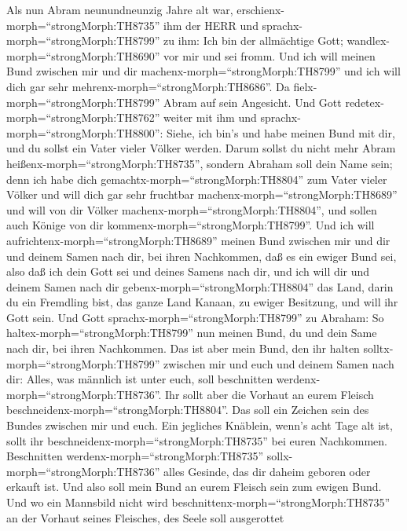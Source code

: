  Als nun Abram neunundneunzig Jahre alt war,
erschienx-morph=``strongMorph:TH8735'' ihm der HERR und
sprachx-morph=``strongMorph:TH8799'' zu ihm: Ich bin der allmächtige
Gott; wandlex-morph=``strongMorph:TH8690'' vor mir und sei fromm.
 Und ich will meinen Bund zwischen mir und dir
machenx-morph=``strongMorph:TH8799'' und ich will dich gar sehr
mehrenx-morph=``strongMorph:TH8686''.  Da
fielx-morph=``strongMorph:TH8799'' Abram auf sein Angesicht. Und Gott
redetex-morph=``strongMorph:TH8762'' weiter mit ihm und
sprachx-morph=``strongMorph:TH8800'':  Siehe, ich bin's und
habe meinen Bund mit dir, und du sollst ein Vater vieler Völker werden.
 Darum sollst du nicht mehr Abram
heißenx-morph=``strongMorph:TH8735'', sondern Abraham soll dein Name
sein; denn ich habe dich gemachtx-morph=``strongMorph:TH8804'' zum Vater
vieler Völker  und will dich gar sehr fruchtbar
machenx-morph=``strongMorph:TH8689'' und will von dir Völker
machenx-morph=``strongMorph:TH8804'', und sollen auch Könige von dir
kommenx-morph=``strongMorph:TH8799''.  Und ich will
aufrichtenx-morph=``strongMorph:TH8689'' meinen Bund zwischen mir und
dir und deinem Samen nach dir, bei ihren Nachkommen, daß es ein ewiger
Bund sei, also daß ich dein Gott sei und deines Samens nach dir,
 und ich will dir und deinem Samen nach dir
gebenx-morph=``strongMorph:TH8804'' das Land, darin du ein Fremdling
bist, das ganze Land Kanaan, zu ewiger Besitzung, und will ihr Gott
sein.  Und Gott sprachx-morph=``strongMorph:TH8799'' zu
Abraham: So haltex-morph=``strongMorph:TH8799'' nun meinen Bund, du und
dein Same nach dir, bei ihren Nachkommen.  Das ist aber
mein Bund, den ihr halten solltx-morph=``strongMorph:TH8799'' zwischen
mir und euch und deinem Samen nach dir: Alles, was männlich ist unter
euch, soll beschnitten werdenx-morph=``strongMorph:TH8736''.
 Ihr sollt aber die Vorhaut an eurem Fleisch
beschneidenx-morph=``strongMorph:TH8804''. Das soll ein Zeichen sein des
Bundes zwischen mir und euch.  Ein jegliches Knäblein,
wenn's acht Tage alt ist, sollt ihr
beschneidenx-morph=``strongMorph:TH8735'' bei euren Nachkommen.
 Beschnitten werdenx-morph=``strongMorph:TH8735''
sollx-morph=``strongMorph:TH8736'' alles Gesinde, das dir daheim geboren
oder erkauft ist. Und also soll mein Bund an eurem Fleisch sein zum
ewigen Bund.  Und wo ein Mannsbild nicht wird
beschnittenx-morph=``strongMorph:TH8735'' an der Vorhaut seines
Fleisches, des Seele soll ausgerottet
